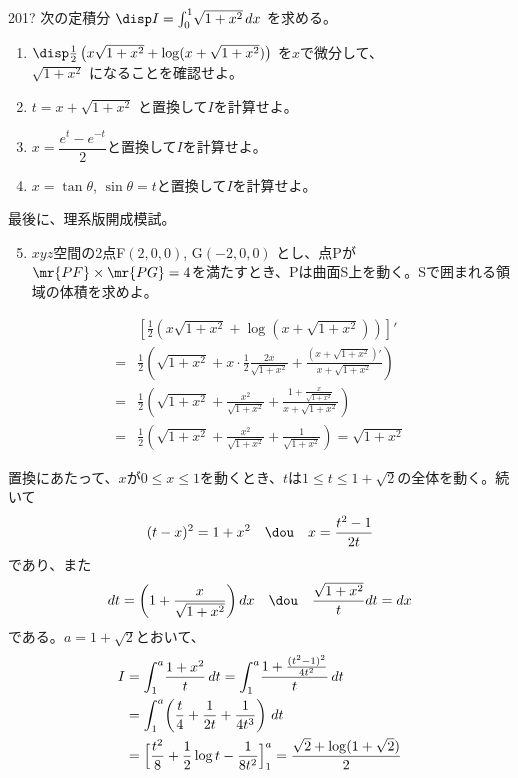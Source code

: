\begin{prob}{201}{\hosi ?}{}
 次の定積分 $\disp I=\int_0^1\! \sqrt{1+x^2} \,dx$ を求める。
 \begin{enumerate}
  \item $\disp \frac{1}{2}\left(x\sqrt{1+x^2}+\log (x+\sqrt{1+x^2})\right)$ を$x$で微分して、\\ $\sqrt{1+x^2}$ になることを確認せよ。
  \item $t=x+\sqrt{1+x^2}$ と置換して$I$を計算せよ。
  \item $x=\dfrac{e^t-e^{-t}}{2}$と置換して$I$を計算せよ。
  \item $x=\tan\theta$, $\sin\theta=t$と置換して$I$を計算せよ。
 \end{enumerate}

 最後に、理系版開成模試。
 \begin{enumerate}
  \setcounter{enumi}{4}
  \item $xyz$空間の2点F$(2,0,0)$, G$(-2,0,0)$ とし、点Pが$\mr{PF}\times\mr{PG}=4$を満たすとき、Pは曲面S上を動く。Sで囲まれる領域の体積を求めよ。
 \end{enumerate}
\end{prob}
\begin{align*}
 &\left[\frac{1}{2}\left(x\sqrt{1+x^2}+\log (x+\sqrt{1+x^2})\right)\right]' \\
 =& \frac{1}{2}\left(\sqrt{1+x^2}+x\cdot\frac{1}{2}\frac{2x}{\sqrt{1+x^2}}+\frac{(x+\sqrt{1+x^2})'}{x+\sqrt{1+x^2}}\right) \\
 =& \frac{1}{2}\left(\sqrt{1+x^2}+\frac{x^2}{\sqrt{1+x^2}}+\frac{1+\frac{x}{\sqrt{1+x^2}}}{x+\sqrt{1+x^2}}\right) \\
 =& \frac{1}{2}\left(\sqrt{1+x^2}+\frac{x^2}{\sqrt{1+x^2}}+\frac{1}{\sqrt{1+x^2}}\right) = \sqrt{1+x^2}
\end{align*}

置換にあたって、$x$が$0\le x \le 1$を動くとき、$t$は$1\le t\le 1+\sqrt{2}$の全体を動く。続いて
\[ (t-x)^2=1+x^2 \quad\dou\quad x=\frac{t^2-1}{2t} \]
であり、また
\[ dt=\left(1+\frac{x}{\sqrt{1+x^2}}\right)dx \quad\dou\quad \frac{\sqrt{1+x^2}}{t}dt=dx \]
である。$a=1+\sqrt{2}$とおいて、
\begin{align*}
 I&=\int_1^a\! \frac{1+x^2}{t} \,dt = \int_1^a\!\frac{1+\frac{(t^2-1)^2}{4t^2}}{t} \,dt \\
 &= \int_1^a\!\left( \frac{t}{4}+\frac{1}{2t}+\frac{1}{4t^3}\right) \,dt \\
 &= \Bigl[ \frac{t^2}{8}+\frac{1}{2}\log t -\frac{1}{8t^2} \Bigr]_1^a = \frac{\sqrt{2}+\log (1+\sqrt{2})}{2}
\end{align*}

